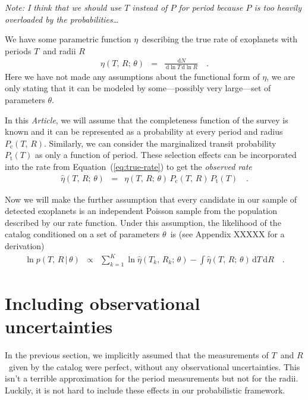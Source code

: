 \documentclass[12pt,preprint]{aastex}
\newcommand{\paper}{\emph{Article}}
\newcommand{\Eq}[1]{Equation~(\ref{eq:#1})}
\newcommand{\eq}[1]{\Eq{#1}}
\newcommand{\eqlabel}[1]{\label{eq:#1}}
\newcommand{\dd}{\ensuremath{\,\mathrm{d}}}
\newcommand{\rate}{\ensuremath{\eta}}
\newcommand{\ratepars}{\ensuremath{\theta}}
\newcommand{\obs}[1]{\ensuremath{\hat{#1}}}
\newcommand{\radius}{\ensuremath{R}}
\newcommand{\period}{\ensuremath{T}}
\newcommand{\completeness}{\ensuremath{P_\mathrm{c}}}
\newcommand{\transitprob}{\ensuremath{P_\mathrm{t}}}
\begin{document}
\emph{Note: I think that we should use $T$ instead of $P$ for period because
$P$ is too heavily overloaded by the probabilities\ldots}

We have some parametric function \rate\ describing the true rate of exoplanets
with periods \period\ and radii \radius
\begin{eqnarray}\eqlabel{true-rate}
\rate (\period,\,\radius;\,\ratepars)
&=& \frac{\dd N}{\dd\ln\period\dd\ln\radius}\quad.
\end{eqnarray}
Here we have not made any assumptions about the functional form of \rate, we
are only stating that it can be modeled by some---possibly very large---set of
parameters \ratepars.

In this \paper, we will assume that the completeness function of the survey is
known and it can be represented as a probability at every period and radius
$\completeness (\period,\,\radius)$.
Similarly, we can consider the marginalized transit probability $\transitprob
(\period)$ as only a function of period.
These selection effects can be incorporated into the rate from \eq{true-rate}
to get the \emph{observed rate}
\begin{eqnarray}\eqlabel{obs-rate}
\obs{\rate} (\period,\,\radius;\,\ratepars)
&=& \rate (\period,\,\radius;\,\ratepars)\,\completeness(\period,\,\radius)\,
\transitprob(\period)\quad.
\end{eqnarray}

Now we will make the further assumption that every candidate in our sample of
detected exoplanets is an independent Poisson sample from the population
described by our rate function.
Under this assumption, the likelihood of the catalog conditioned on a set of
parameters \ratepars\ is (see Appendix XXXXX for a derivation)
\begin{eqnarray}
\ln p(\period,\,\radius\,|\,\ratepars) &\propto&
\sum_{k=1}^K \ln\obs{\rate} (\period_k,\,\radius_k;\,\ratepars)
- \int \obs{\rate} (\period,\,\radius;\,\ratepars) \dd\period\dd\radius
\quad.
\end{eqnarray}

\section{Including observational uncertainties}

In the previous section, we implicitly assumed that the measurements of
\period\ and \radius\ given by the catalog were perfect, without any
observational uncertainties.
This isn't a terrible approximation for the period measurements but not for
the radii.
Luckily, it is not hard to include these effects in our probabilistic
framework.
\end{document}
